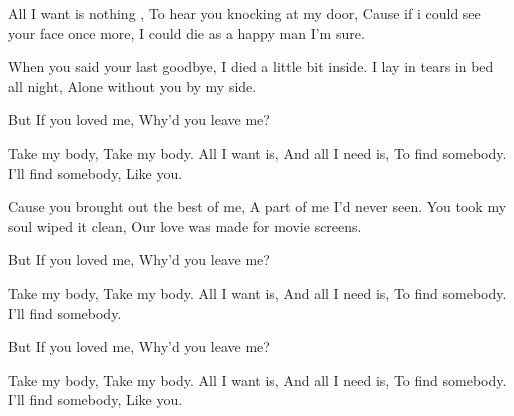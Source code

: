 \resetVars%
%
%
%
%
%
\MakeHeader%
\Lyrics%
All I want is nothing ,
To hear you knocking at my door,
Cause if i could see your face once more,
I could die as a happy man I'm sure.

When you said your last goodbye,
I died a little bit inside.
I lay in tears in bed all night,
Alone without you by my side. 

But If you loved me,
Why'd you leave me?

Take my body,
Take my body.
All I want is,
And all I need is,
To find somebody.
I'll find somebody,
Like you.

Cause you brought out the best of me,
A part of me I'd never seen.
You took my soul wiped it clean,
Our love was made for movie screens.

But If you loved me,
Why'd you leave me?

Take my body,
Take my body.
All I want is,
And all I need is,
To find somebody.
I'll find somebody.

But If you loved me,
Why'd you leave me?

Take my body,
Take my body.
All I want is,
And all I need is,
To find somebody.
I'll find somebody,
Like you.

\StrummingStart%
%
\DownHalf\UpMiss\DownStress\UpMiss\DownMiss\Up\Down\Up%
\StrummingEnd%

\Next
